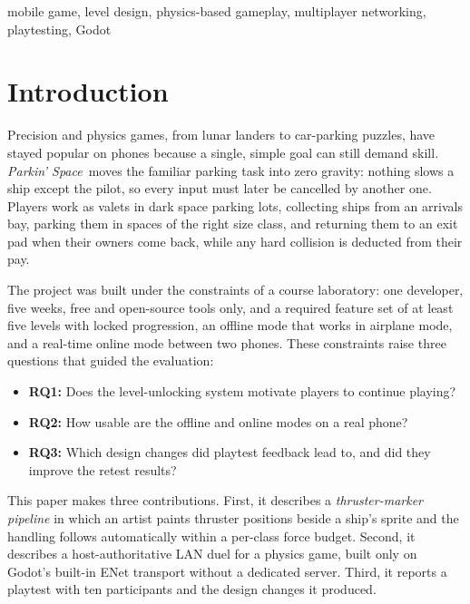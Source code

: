 \documentclass[conference]{IEEEtran}
\newcommand{\game}{\textit{Parkin' Space}}
\begin{document}
\begin{IEEEkeywords}
mobile game, level design, physics-based gameplay, multiplayer networking, playtesting, Godot
\end{IEEEkeywords}

\section{Introduction}
Precision and physics games, from lunar landers to car-parking puzzles, have stayed popular on phones because a single, simple goal can still demand skill. \game\ moves the familiar parking task into zero gravity: nothing slows a ship except the pilot, so every input must later be cancelled by another one. Players work as valets in dark space parking lots, collecting ships from an arrivals bay, parking them in spaces of the right size class, and returning them to an exit pad when their owners come back, while any hard collision is deducted from their pay.

The project was built under the constraints of a course laboratory: one developer, five weeks, free and open-source tools only, and a required feature set of at least five levels with locked progression, an offline mode that works in airplane mode, and a real-time online mode between two phones. These constraints raise three questions that guided the evaluation:
\begin{itemize}
\item \textbf{RQ1:} Does the level-unlocking system motivate players to continue playing?
\item \textbf{RQ2:} How usable are the offline and online modes on a real phone?
\item \textbf{RQ3:} Which design changes did playtest feedback lead to, and did they improve the retest results?
\end{itemize}

This paper makes three contributions. First, it describes a \emph{thruster-marker pipeline} in which an artist paints thruster positions beside a ship's sprite and the handling follows automatically within a per-class force budget. Second, it describes a host-authoritative LAN duel for a physics game, built only on Godot's built-in ENet transport without a dedicated server. Third, it reports a playtest with ten participants and the design changes it produced.

\end{document}
